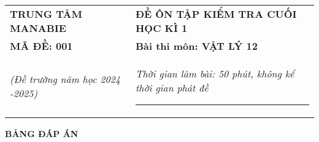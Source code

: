 \begin{tabular}{M{6.5cm}M{11cm}}
	\textbf{TRUNG TÂM MANABIE}& \textbf{ĐỀ ÔN TẬP KIỂM TRA CUỐI HỌC KÌ 1}\\
	\textbf{MÃ ĐỀ: 001}& \textbf{Bài thi môn: VẬT LÝ 12}\\
	\textit{(Đề trường  năm học 2024 -2025)}& \textit{Thời gian làm bài: 50 phút, không kể thời gian phát đề}
	
	\noindent\rule{4cm}{0.8pt} \\
\end{tabular}
\setcounter{section}{0}
\begin{center}
	\textbf{\large BẢNG ĐÁP ÁN}
\end{center}
\section{}
\section{}
\section{}



